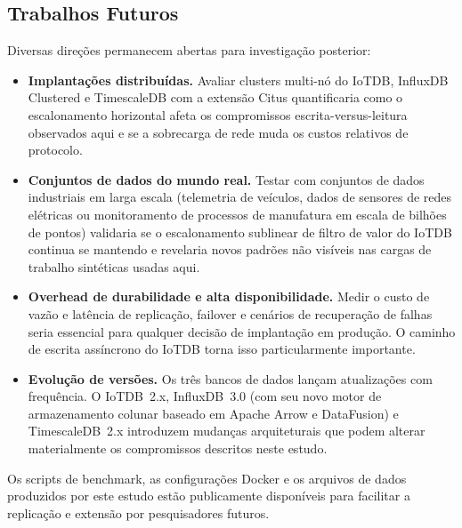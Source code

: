 \subsection{Trabalhos Futuros}
\label{sec:future-work}

Diversas direções permanecem abertas para investigação posterior:

\begin{itemize}
  \item \textbf{Implantações distribuídas.} Avaliar clusters multi-nó do IoTDB, InfluxDB
    Clustered e TimescaleDB com a extensão Citus quantificaria como o escalonamento horizontal
    afeta os compromissos escrita-versus-leitura observados aqui e se a sobrecarga de rede muda
    os custos relativos de protocolo.

  \item \textbf{Conjuntos de dados do mundo real.} Testar com conjuntos de dados industriais
    em larga escala (telemetria de veículos, dados de sensores de redes elétricas ou
    monitoramento de processos de manufatura em escala de bilhões de pontos) validaria se o
    escalonamento sublinear de filtro de valor do IoTDB continua se mantendo e revelaria novos
    padrões não visíveis nas cargas de trabalho sintéticas usadas aqui.

  \item \textbf{Overhead de durabilidade e alta disponibilidade.} Medir o custo de vazão e
    latência de replicação, failover e cenários de recuperação de falhas seria essencial para
    qualquer decisão de implantação em produção. O caminho de escrita assíncrono do IoTDB torna
    isso particularmente importante.

  \item \textbf{Evolução de versões.} Os três bancos de dados lançam atualizações com
    frequência. O IoTDB~2.x, InfluxDB~3.0 (com seu novo motor de armazenamento colunar baseado
    em Apache Arrow e DataFusion) e TimescaleDB~2.x introduzem mudanças arquiteturais que podem
    alterar materialmente os compromissos descritos neste estudo.
\end{itemize}

Os scripts de benchmark, as configurações Docker e os arquivos de dados produzidos por este
estudo estão publicamente disponíveis para facilitar a replicação e extensão por pesquisadores
futuros.
